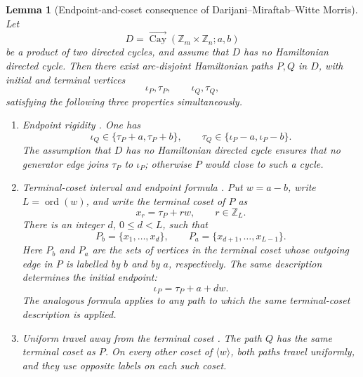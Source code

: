 \documentclass[11pt]{article}
\newtheorem{lemma}[theorem]{Lemma}
\newcommand{\Cay}{\overrightarrow{\operatorname{Cay}}}
\newcommand{\Z}{\mathbb Z}
\newcommand{\ord}{\operatorname{ord}}
\begin{document}
\begin{lemma}[Endpoint-and-coset consequence of Darijani--Miraftab--Witte Morris]\label{input:twocycle-structure}
Let
\[
        D=\Cay(\Z_m\times\Z_n;a,b)
\]
be a product of two directed cycles, and assume that $D$ has no Hamiltonian directed cycle.  Then there exist arc-disjoint Hamiltonian paths $P,Q$ in $D$, with initial and terminal vertices
\[
        \iota_P,\tau_P,
        \qquad
        \iota_Q,\tau_Q,
\]
satisfying the following three properties simultaneously.
\begin{enumerate}[label=(\roman*),leftmargin=*]
\item \emph{Endpoint rigidity} \cite[Proposition~4.6]{DMM}.  One has
\[
        \iota_Q\in\{\tau_P+a,\tau_P+b\},
        \qquad
        \tau_Q\in\{\iota_P-a,\iota_P-b\}.
\]
The assumption that $D$ has no Hamiltonian directed cycle ensures that no generator edge joins $\tau_P$ to $\iota_P$; otherwise $P$ would close to such a cycle.

\item \emph{Terminal-coset interval and endpoint formula} \cite[Lemma~3.9]{DMM}.  Put $w=a-b$, write $L=\ord(w)$, and write the terminal coset of $P$ as
\[
        x_r=\tau_P+rw,
        \qquad r\in\Z_L.
\]
There is an integer $d$, $0\le d<L$, such that
\[
        P_b=\{x_1,\ldots,x_d\},
        \qquad
        P_a=\{x_{d+1},\ldots,x_{L-1}\}.
\]
Here $P_b$ and $P_a$ are the sets of vertices in the terminal coset whose outgoing edge in $P$ is labelled by $b$ and by $a$, respectively.  The same description determines the initial endpoint:
\[
        \iota_P=\tau_P+a+dw.
\]
The analogous formula applies to any path to which the same terminal-coset description is applied.

\item \emph{Uniform travel away from the terminal coset} \cite[Lemma~3.9]{DMM}.  The path $Q$ has the same terminal coset as $P$.  On every other coset of $\langle w\rangle$, both paths travel uniformly, and they use opposite labels on each such coset.
\end{enumerate}
\end{lemma}
\end{document}
